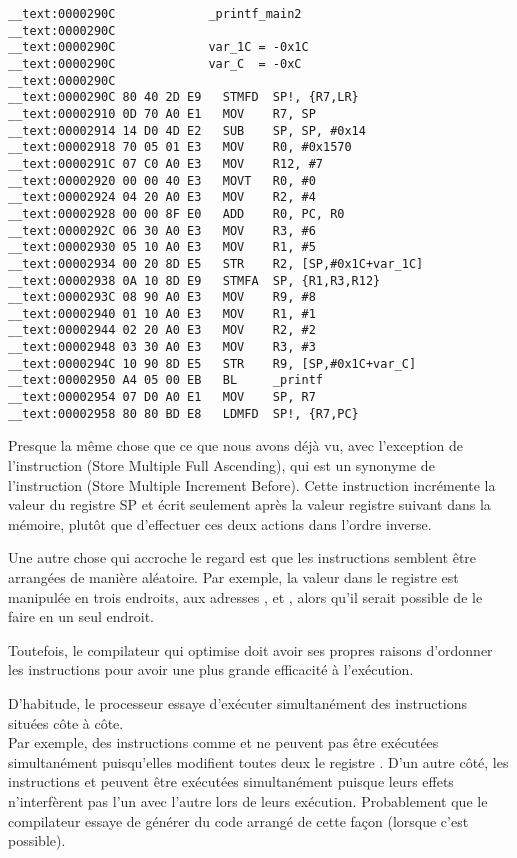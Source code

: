 \myparagraph{\OptimizingXcodeIV: \ARMMode}

\begin{lstlisting}[style=customasmARM]
__text:0000290C             _printf_main2
__text:0000290C
__text:0000290C             var_1C = -0x1C
__text:0000290C             var_C  = -0xC
__text:0000290C
__text:0000290C 80 40 2D E9   STMFD  SP!, {R7,LR}
__text:00002910 0D 70 A0 E1   MOV    R7, SP
__text:00002914 14 D0 4D E2   SUB    SP, SP, #0x14
__text:00002918 70 05 01 E3   MOV    R0, #0x1570
__text:0000291C 07 C0 A0 E3   MOV    R12, #7
__text:00002920 00 00 40 E3   MOVT   R0, #0
__text:00002924 04 20 A0 E3   MOV    R2, #4
__text:00002928 00 00 8F E0   ADD    R0, PC, R0
__text:0000292C 06 30 A0 E3   MOV    R3, #6
__text:00002930 05 10 A0 E3   MOV    R1, #5
__text:00002934 00 20 8D E5   STR    R2, [SP,#0x1C+var_1C]
__text:00002938 0A 10 8D E9   STMFA  SP, {R1,R3,R12}
__text:0000293C 08 90 A0 E3   MOV    R9, #8
__text:00002940 01 10 A0 E3   MOV    R1, #1
__text:00002944 02 20 A0 E3   MOV    R2, #2
__text:00002948 03 30 A0 E3   MOV    R3, #3
__text:0000294C 10 90 8D E5   STR    R9, [SP,#0x1C+var_C]
__text:00002950 A4 05 00 EB   BL     _printf
__text:00002954 07 D0 A0 E1   MOV    SP, R7
__text:00002958 80 80 BD E8   LDMFD  SP!, {R7,PC}
\end{lstlisting}

Presque la même chose que ce que nous avons déjà vu, avec l'exception de l'instruction
 (Store Multiple Full Ascending), qui est un synonyme de l'instruction
 (Store Multiple Increment Before).
Cette instruction incrémente la valeur du registre \ac{SP} et écrit seulement
après la valeur registre suivant dans la mémoire, plutôt que d'effectuer ces
deux actions dans l'ordre inverse.

Une autre chose qui accroche le regard est que les instructions semblent être arrangées
de manière aléatoire.
Par exemple, la valeur dans le registre  est manipulée en trois endroits,
aux adresses ,  et , alors qu'il serait possible
de le faire en un seul endroit.

Toutefois, le compilateur qui optimise doit avoir ses propres raisons d'ordonner
les instructions pour avoir une plus grande efficacité à l'exécution.

D'habitude, le processeur essaye d'exécuter simultanément des instructions situées côte à côte.\\
Par exemple, des instructions comme  et  ne
peuvent pas être exécutées simultanément puisqu'elles modifient toutes deux le
registre .
D'un autre côté, les instructions  et  peuvent
être exécutées simultanément puisque leurs effets n'interfèrent pas l'un avec l'autre
lors de leurs exécution.
Probablement que le compilateur essaye de générer du code arrangé de cette façon
(lorsque c'est possible).

